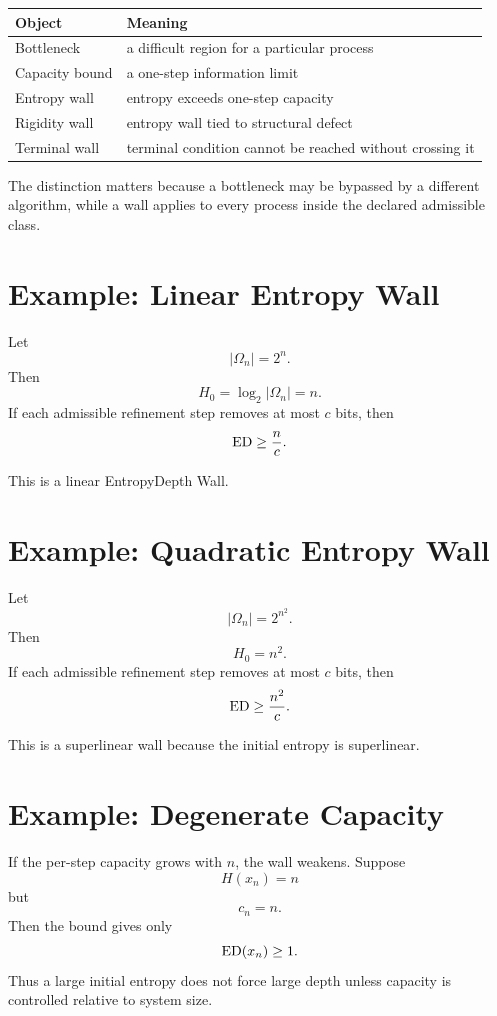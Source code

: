 \begin{center}
\begin{tabular}{ll}
\toprule
Object & Meaning \\
\midrule
Bottleneck & a difficult region for a particular process \\
Capacity bound & a one-step information limit \\
Entropy wall & entropy exceeds one-step capacity \\
Rigidity wall & entropy wall tied to structural defect \\
Terminal wall & terminal condition cannot be reached without crossing it \\
\bottomrule
\end{tabular}
\end{center}

The distinction matters because a bottleneck may be bypassed by a different
algorithm, while a wall applies to every process inside the declared admissible
class.

\section{Example: Linear Entropy Wall}

Let
\[
|\Omega_n|=2^n.
\]
Then
\[
H_0=\log_2|\Omega_n|=n.
\]
If each admissible refinement step removes at most \(c\) bits, then
\[
\mathrm{ED}\ge \frac{n}{c}.
\]

This is a linear EntropyDepth Wall.

\section{Example: Quadratic Entropy Wall}

Let
\[
|\Omega_n|=2^{n^2}.
\]
Then
\[
H_0=n^2.
\]
If each admissible refinement step removes at most \(c\) bits, then
\[
\mathrm{ED}\ge \frac{n^2}{c}.
\]

This is a superlinear wall because the initial entropy is superlinear.

\section{Example: Degenerate Capacity}

If the per-step capacity grows with \(n\), the wall weakens. Suppose
\[
H(x_n)=n
\]
but
\[
c_n=n.
\]
Then the bound gives only
\[
\mathrm{ED}(x_n)\ge 1.
\]
Thus a large initial entropy does not force large depth unless capacity is
controlled relative to system size.

